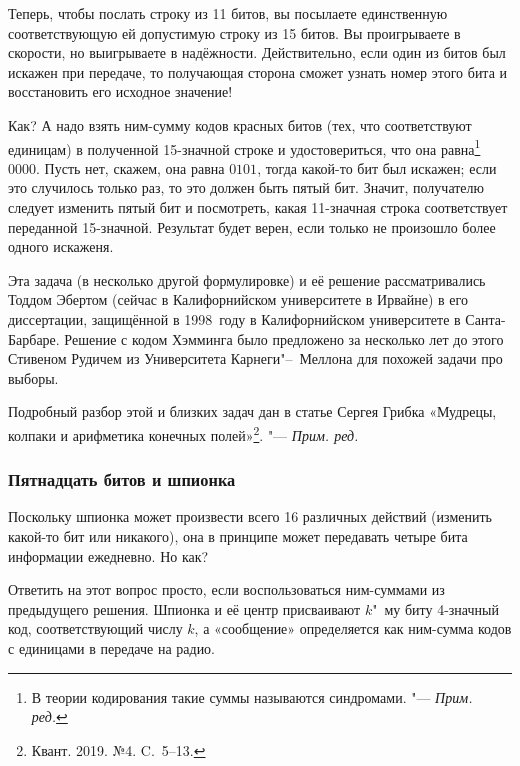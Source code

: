 \documentclass[twoside]{book}
\newenvironment{addedbytheeditors}{\par\medskip\small
}{\par\addvspace{\medskipamount}} %
\begin{document}
Теперь, чтобы послать строку из 11 битов, вы посылаете единственную
соответствующую ей допустимую строку из 15 битов.
Вы проигрываете в
скорости, но выигрываете в надёжности.
Действительно, если один из
битов был искажен при передаче, то получающая сторона сможет узнать
номер этого бита и восстановить его исходное значение!

Как? А надо взять ним-сумму кодов красных битов (тех, что соответствуют единицам) в полученной 15-значной строке и удостовериться, что она равна\footnote{В теории кодирования такие суммы называются синдромами. "--- \emph{Прим. ред.}} $0000$. 
Пусть нет, скажем, она равна $0101$,
тогда какой-то бит был искажен;
если это случилось только раз, то это должен быть пятый бит.
Значит, получателю следует изменить пятый бит и посмотреть, какая 11-значная строка соответствует переданной 15-значной.
Результат будет верен, если только не произошло более одного искаженя.


Эта задача (в несколько другой формулировке) и её решение рассматривались Тоддом Эбертом (сейчас в Калифорнийском университете в Ирвайне) в его диссертации, защищённой в 1998~году в Калифорнийском университете в Санта-Барбаре.
Решение с кодом Хэмминга было предложено за несколько лет до этого Стивеном Рудичем из Университета Карнеги"--~Меллона  для похожей задачи про выборы.

\begin{addedbytheeditors}
Подробный разбор этой и близких задач дан в статье Сергея Грибка
«Мудрецы, колпаки и арифметика конечных полей»\footnote{Квант. 2019. №4. C.~5--13.}.
"--- \emph{Прим. ред.}  
\end{addedbytheeditors}

\subsubsection*{Пятнадцать битов и шпионка}

Поскольку шпионка может произвести всего 16 различных действий (изменить какой-то бит или никакого),  она в принципе может передавать четыре бита информации ежедневно.
Но как?

Ответить на этот вопрос просто, если воспользоваться ним-суммами из предыдущего решения.
Шпионка и её центр присваивают $k$"~му биту 4-значный код, соответствующий числу $k$, а «сообщение» определяется как ним-сумма кодов с единицами в передаче на радио.
\end{document}

